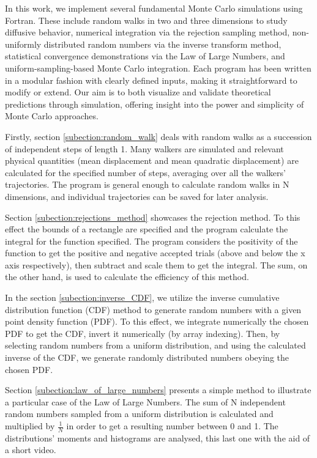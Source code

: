In this work, we implement several fundamental Monte Carlo simulations using Fortran. These include random walks in two and three dimensions to study diffusive behavior, numerical integration via the rejection sampling method, non-uniformly distributed random numbers via the inverse transform method, statistical convergence demonstrations via the Law of Large Numbers, and uniform-sampling-based Monte Carlo integration. Each program has been written in a modular fashion with clearly defined inputs, making it straightforward to modify or extend. Our aim is to both visualize and validate theoretical predictions through simulation, offering insight into the power and simplicity of Monte Carlo approaches.

Firstly, section \ref{subection:random_walk} deals with random walks as a succession of independent steps of length 1. Many walkers are simulated and relevant physical quantities (mean displacement and mean quadratic displacement) are calculated for the specified number of steps, averaging over all the walkers' trajectories. The program is general enough to calculate random walks in N dimensions, and individual trajectories can be saved for later analysis.

Section \ref{subection:rejections_method} showcases the rejection method. To this effect the bounds of a rectangle are specified and the program calculate the integral for the function specified. The program considers the positivity of the function to get the positive and negative accepted trials (above and below the x axis respectively), then subtract and scale them to get the integral. The sum, on the other hand, is used to calculate the efficiency of this method.

In the section \ref{subection:inverse_CDF}, we utilize the inverse cumulative distribution function (CDF) method to generate random numbers with a given point density function (PDF). To this effect, we integrate numerically the chosen PDF to get the CDF, invert it numerically (by array indexing). Then, by selecting random numbers from a uniform distribution, and using the calculated inverse of the CDF, we generate randomly distributed numbers obeying the chosen PDF.

Section \ref{subection:law_of_large_numbers} presents a simple method to illustrate a particular case of the Law of Large Numbers. The sum of N independent random numbers sampled from a uniform distribution is calculated and multiplied by $\frac{1}{N}$ in order to get a resulting number between 0 and 1. The distributions' moments and histograms are analysed, this last one with the aid of a short video.


